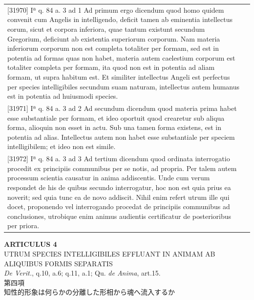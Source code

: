 \documentclass[paper=a4paper,fontsize=10pt,jafontsize=9pt,titlepage]{jlreq}
\begin{document}
\begin{longtable}{p{21em}p{21em}}
\\[1em]




[31970] Iª q. 84 a. 3 ad 1
 Ad primum ergo dicendum quod homo quidem convenit cum Angelis in intelligendo, deficit tamen ab eminentia intellectus eorum, sicut et corpora inferiora, quae tantum existunt secundum Gregorium, deficiunt ab existentia superiorum corporum. Nam materia inferiorum corporum non est completa totaliter per formam, sed est in potentia ad formas quas non habet, materia autem caelestium corporum est totaliter completa per formam, ita quod non est in potentia ad aliam formam, ut supra habitum est. Et similiter intellectus Angeli est perfectus per species intelligibiles secundum suam naturam, intellectus autem humanus est in potentia ad huiusmodi species.

 
 
&

\\[1em]




[31971] Iª q. 84 a. 3 ad 2
 Ad secundum dicendum quod materia prima habet esse substantiale per formam, et ideo oportuit quod crearetur sub aliqua forma, alioquin non esset in actu. Sub una tamen forma existens, est in potentia ad alias. Intellectus autem non habet esse substantiale per speciem intelligibilem; et ideo non est simile.

 
 
&

\\[1em]




[31972] Iª q. 84 a. 3 ad 3
 Ad tertium dicendum quod ordinata interrogatio procedit ex principiis communibus per se notis, ad propria. Per talem autem processum scientia causatur in anima addiscentis. Unde cum verum respondet de his de quibus secundo interrogatur, hoc non est quia prius ea noverit; sed quia tunc ea de novo addiscit. Nihil enim refert utrum ille qui docet, proponendo vel interrogando procedat de principiis communibus ad conclusiones, utrobique enim animus audientis certificatur de posterioribus per priora.

 
 
&


\end{longtable}
\newpage
{}
\begin{center}
{\Large {\bfseries ARTICULUS 4}}\\
{\large UTRUM SPECIES INTELLIGIBILES EFFLUANT IN ANIMAM AB ALIQUIBUS FORMIS SEPARATIS}\\
{\footnotesize {\itshape De Verit.}, q.10, a.6; q.11, a.1; Qu. {\itshape de Anima}, art.15.}\\
{\Large 第四項\\知性的形象は何らかの分離した形相から魂へ流入するか}
\end{center}
\end{document}
